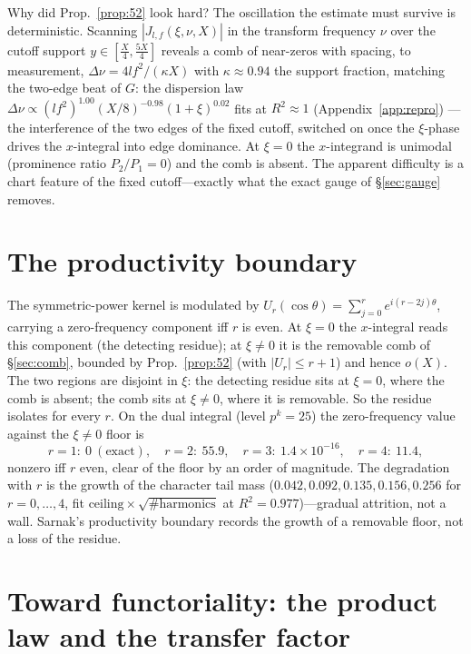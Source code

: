 \documentclass[11pt]{article}
\theoremstyle{definition}
\begin{document}
Why did Prop.~\ref{prop:52} look hard? The oscillation the estimate must survive is deterministic.
Scanning $|J_{l,f}(\xi,\nu,X)|$ in the transform frequency $\nu$ over the cutoff support
$y\in[\tfrac X4,\tfrac{5X}4]$ reveals a comb of near-zeros with spacing, to measurement,
$\Delta\nu=4lf^2/(\kappa X)$ with $\kappa\approx0.94$ the support fraction, matching the two-edge
beat of $G$: the dispersion law $\Delta\nu\propto(lf^2)^{1.00}(X/8)^{-0.98}(1+\xi)^{0.02}$ fits at
$R^2\approx1$ (Appendix~\ref{app:repro}) --- the interference of the two edges of the fixed cutoff, switched on once
the $\xi$-phase drives the $x$-integral into edge dominance. At $\xi=0$ the $x$-integrand is unimodal
(prominence ratio $P_2/P_1=0$) and the comb is absent. The apparent difficulty is a chart feature of
the fixed cutoff---exactly what the exact gauge of \S\ref{sec:gauge} removes.

\section{The productivity boundary}\label{sec:sarnak}

The symmetric-power kernel is modulated by $U_r(\cos\theta)=\sum_{j=0}^r e^{i(r-2j)\theta}$, carrying
a zero-frequency component iff $r$ is even. At $\xi=0$ the $x$-integral reads this component (the
detecting residue); at $\xi\neq0$ it is the removable comb of \S\ref{sec:comb}, bounded by
Prop.~\ref{prop:52} (with $|U_r|\le r+1$) and hence $o(X)$. The two regions are disjoint in $\xi$:
the detecting residue sits at $\xi=0$, where the comb is absent; the comb sits at $\xi\neq0$, where it
is removable. So the residue isolates for every $r$. On the dual integral (level $p^k=25$) the
zero-frequency value against the $\xi\neq0$ floor is
\[
  r=1:\ 0\ (\text{exact}),\quad r=2:\ 55.9,\quad r=3:\ 1.4\times10^{-16},\quad r=4:\ 11.4,
\]
nonzero iff $r$ even, clear of the floor by an order of magnitude. The degradation with $r$ is the
growth of the character tail mass ($0.042,0.092,0.135,0.156,0.256$ for $r=0,\dots,4$, fit
$\text{ceiling}\times\sqrt{\#\text{harmonics}}$ at $R^2=0.977$)---gradual attrition, not a wall.
Sarnak's productivity boundary \cite[fn.~5]{AltIII} records the growth of a removable floor, not a
loss of the residue.

\section{Toward functoriality: the product law and the transfer factor}\label{sec:gue}
\end{document}
